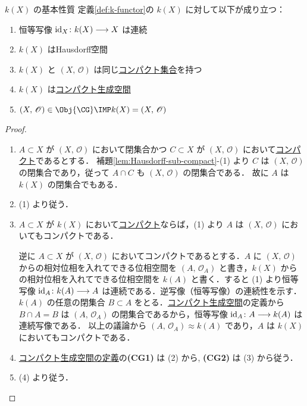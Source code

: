 \documentclass[algtopo_main]{subfiles}
\begin{document}
\begin{myprop}[label=prop:k-functor-basic, breakable]{$k(X)$ の基本性質}
    定義\ref{def:k-functor}の $k(X)$ に対して以下が成り立つ：
    \begin{enumerate}
        \item 恒等写像 $\mathrm{id}_X \colon k(X) \longrightarrow X$ は連続
        \item $k(X)$ はHausdorff空間
        \item $k(X)$ と $(X,\, \mathscr{O})$ は同じ\hyperref[def:compact]{コンパクト集合}を持つ
        \item $k(X)$ は\hyperref[def:CG]{コンパクト生成空間}
        \item $(X,\, \mathscr{O}) \in \Obj{\CG} \IMP k(X) = (X,\, \mathscr{O})$
    \end{enumerate}
\end{myprop}


\begin{proof}
    \begin{enumerate}
        \item $A \subset X$ が $(X,\, \mathscr{O})$ において閉集合かつ $C \subset X$ が $(X,\, \mathscr{O})$ において\hyperref[def:compact]{コンパクト}であるとする．
        補題\ref{lem:Hausdorff-sub-compact}-(1) より $C$ は $(X,\, \mathscr{O})$ の閉集合であり，従って $A \cap C$ も $(X,\, \mathscr{O})$ の閉集合である．
        故に $A$ は $k(X)$ の閉集合でもある．
        \item (1) より従う．
        \item $A \subset X$ が $k(X)$ において\hyperref[def:compact]{コンパクト}ならば，(1) より $A$ は $(X,\, \mathscr{O})$ においてもコンパクトである．
        
        逆に $A \subset X$ が $(X,\, \mathscr{O})$ においてコンパクトであるとする．$A$ に $(X,\, \mathscr{O})$ からの相対位相を入れてできる位相空間を $(A,\, \mathscr{O}_A)$ と書き，$k(X)$ からの相対位相を入れてできる位相空間を $k(A)$ と書く．すると (1) より恒等写像 $\mathrm{id}_A \colon k(A) \longrightarrow A$ は連続である．逆写像（恒等写像）の連続性を示す．
        $k(A)$ の任意の閉集合 $B \subset A$ をとる．\hyperref[def:CG]{コンパクト生成空間}の定義から $B \cap A = B$ は $(A,\, \mathscr{O}_A)$ の閉集合であるから，恒等写像 $\mathrm{id}_A \colon A \longrightarrow k(A)$ は連続写像である．
        以上の議論から $(A,\, \mathscr{O}_A) \approx k(A)$ であり，$A$ は $k(X)$ においてもコンパクトである．
        \item \hyperref[def:CG]{コンパクト生成空間の定義}の\textbf{\textsf{(CG1)}} は (2) から, \textbf{\textsf{(CG2)}} は (3) から従う．
        \item (4) より従う．
    \end{enumerate}
\end{proof}
\end{document}
